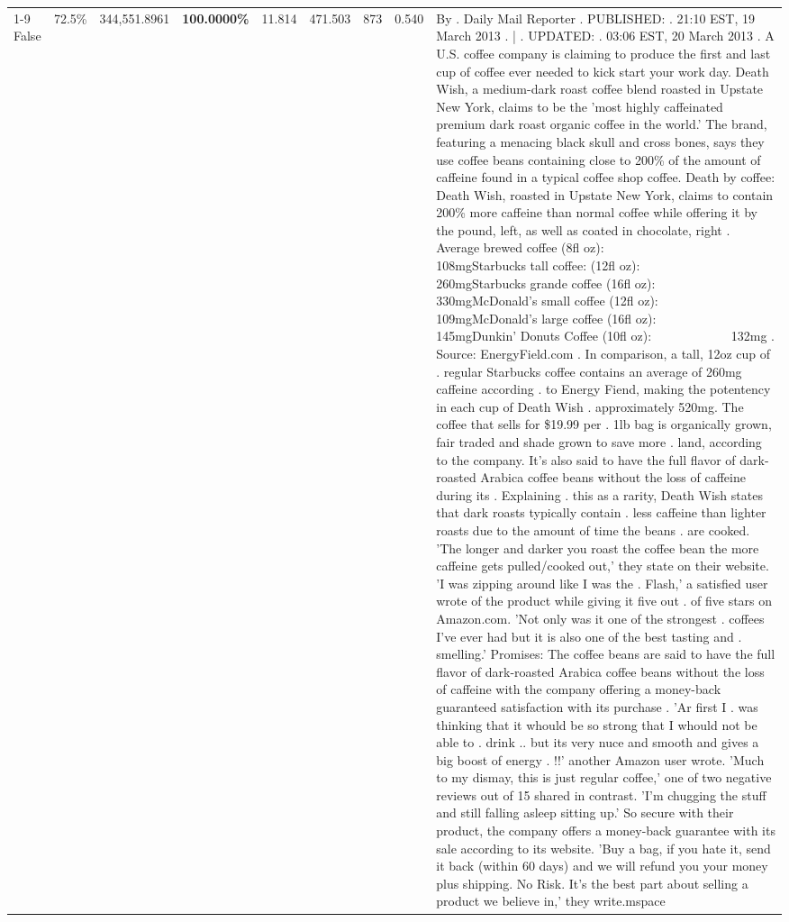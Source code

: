\begin{table}[H]
{\begin{tabular}{lllrlllll}
\cline{1-9}
False & 72.5\% & 344,551.8961 & \bfseries \color{red} 100.0000\% & 11.814 & 471.503 & 873 & 0.540 & By . Daily Mail Reporter . PUBLISHED: . 21:10 EST, 19 March 2013 . | . UPDATED: . 03:06 EST, 20 March 2013 . A U.S. coffee company is claiming to produce the first and last cup of coffee ever needed to kick start your work day. Death Wish, a medium-dark roast coffee blend roasted in Upstate New York, claims to be the 'most highly caffeinated premium dark roast organic coffee in the world.' The brand, featuring a menacing black skull and cross bones, says they use coffee beans containing close to 200\% of the amount of caffeine found in a typical coffee shop coffee. Death by coffee: Death Wish, roasted in Upstate New York, claims to contain 200\% more caffeine than normal coffee while offering it by the pound, left, as well as coated in chocolate, right . Average brewed coffee (8fl oz):              108mgStarbucks tall coffee: (12fl oz):                260mgStarbucks grande coffee (16fl oz):         330mgMcDonald's small coffee (12fl oz):           109mgMcDonald's large coffee (16fl oz):           145mgDunkin' Donuts Coffee (10fl oz):             132mg . Source: EnergyField.com . In comparison, a tall, 12oz cup of . regular Starbucks coffee contains an average of 260mg caffeine according . to Energy Fiend, making the potentency in each cup of Death Wish . approximately 520mg. The coffee that sells for \$19.99 per . 1lb bag is organically grown, fair traded and shade grown to save more . land, according to the company. It's also said to have the full flavor of dark-roasted Arabica coffee beans without the loss of caffeine during its . Explaining . this as a rarity, Death Wish states that dark roasts typically contain . less caffeine than lighter roasts due to the amount of time the beans . are cooked. 'The longer and darker you roast the coffee bean the more caffeine gets pulled/cooked out,' they state on their website. 'I was zipping around like I was the . Flash,' a satisfied user wrote of the product while giving it five out . of five stars on Amazon.com. 'Not only was it one of the strongest . coffees I've ever had but it is also one of the best tasting and . smelling.’ Promises: The coffee beans are said to have the full flavor of dark-roasted Arabica coffee beans without the loss of caffeine with the company offering a money-back guaranteed satisfaction with its purchase . 'Ar first I . was thinking that it whould be so strong that I whould not be able to . drink .. but its very nuce and smooth and gives a big boost of energy . !!' another Amazon user wrote. 'Much to my dismay, this is just regular coffee,' one of two negative reviews out of 15 shared in contrast. 'I'm chugging the stuff and still falling asleep sitting up.' So secure with their product, the company offers a money-back guarantee with its sale according to its website. 'Buy a bag, if you hate it, send it back (within 60 days) and we will refund you your money plus shipping. No Risk. It’s the best part about selling a product we believe in,' they write.mspace \\

\end{tabular}}
\end{table}
